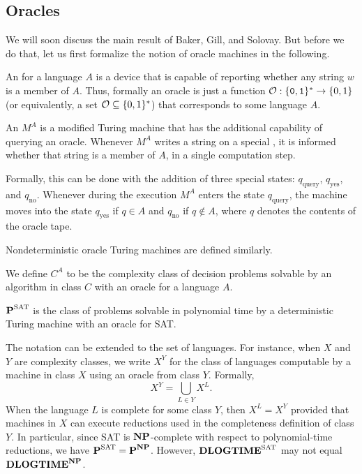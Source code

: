 \subsection{Oracles}
We will soon discuss the main result of Baker, Gill, and Solovay. But before we do that, let us first formalize the notion of oracle machines in the following.

\begin{definition}[Oracles]
  An  for a language $A$ is a device that is capable of reporting whether any string $w$ is a member of $A$. Thus, formally an oracle is just a function $\mathcal{O} : \{ \texttt{0}, \texttt{1} \}^\ast \to \{ 0, 1 \}$ (or equivalently, a set $\mathcal{O} \subseteq \{ 0, 1 \}^\ast$) that corresponds to some language $A$.
\end{definition}

\begin{definition}
  An  $M^A$ is a modified Turing machine that has the additional capability of querying an oracle. Whenever $M^A$ writes a string on a special , it is informed whether that string is a member of $A$, in a single computation step.

  Formally, this can be done with the addition of three special states: $q_\text{query}$, $q_\text{yes}$, and $q_\text{no}$. Whenever during the execution $M^A$ enters the state $q_\text{query}$, the machine moves into the state $q_\text{yes}$ if $q \in A$ and $q_\text{no}$ if $q \notin A$, where $q$ denotes the contents of the oracle tape.
\end{definition}

Nondeterministic oracle Turing machines are defined similarly.

\begin{definition}
  We define $C^A$ to be the complexity class of decision problems solvable by an algorithm in class $C$ with an oracle for a language $A$.
\end{definition}

\begin{example}
  $\textbf{P}^{\text{SAT}}$ is the class of problems solvable in polynomial time by a deterministic Turing machine with an oracle for SAT.
\end{example}

The notation can be extended to the set of languages. For instance, when $X$ and $Y$ are complexity classes, we write $X^Y$ for the class of languages computable by a machine in class $X$ using an oracle from class $Y$. Formally,
\[ X^Y = \bigcup_{L \in Y} X^L. \]
When the language $L$ is complete for some class $Y$, then $X^L = X^Y$ provided that machines in $X$ can execute reductions used in the completeness definition of class $Y$. In particular, since SAT is $\textbf{NP}$-complete with respect to polynomial-time reductions, we have $\textbf{P}^{\text{SAT}} = \textbf{P}^{\textbf{NP}}$. However, $\textbf{DLOGTIME}^{\text{SAT}}$ may not equal $\textbf{DLOGTIME}^{\textbf{NP}}$.

